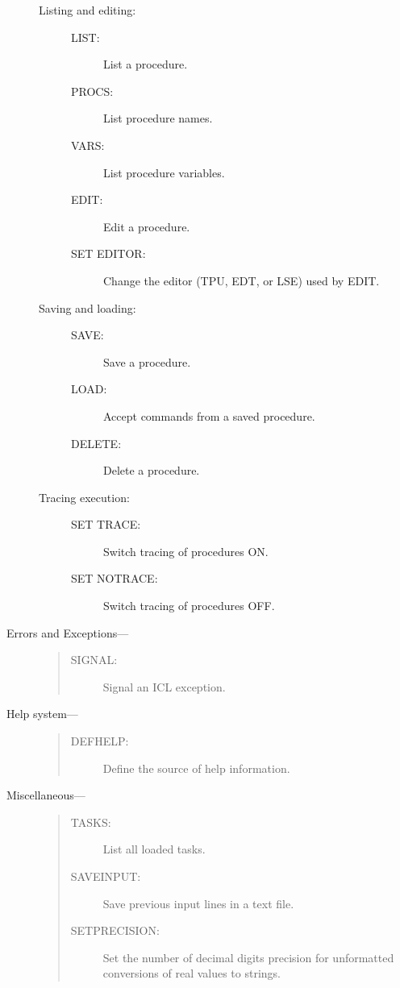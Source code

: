 \begin{description}
\begin{description}
\item [Listing and editing:] \mbox{}
\begin{description}
\item[LIST:]
 List a procedure.
\item[PROCS:]
 List procedure names.
\item[VARS:]
 List procedure variables.
\item[EDIT:]
 Edit a procedure.
\item[SET EDITOR:]
 Change the editor (TPU, EDT, or LSE) used by EDIT.
\end{description}
\item [Saving and loading:] \mbox{}
\begin{description}
\item[SAVE:]
 Save a procedure.
\item[LOAD:]
 Accept commands from a saved procedure.
\item[DELETE:]
 Delete a procedure.
\end{description}
\item [Tracing execution:] \mbox{}
\begin{description}
\item[SET TRACE:]
 Switch tracing of procedures ON.
\item[SET NOTRACE:]
 Switch tracing of procedures OFF.
\end{description}
\end{description}

\item [Errors and Exceptions--- ]

\begin{quote}
\begin{description}
\item[SIGNAL:]
 Signal an ICL exception.
\end{description}
\end{quote}

\item [Help system--- ]

\begin{quote}
\begin{description}
\item[DEFHELP:]
 Define the source of help information.
\end{description}
\end{quote}

\item [Miscellaneous--- ]

\begin{quote}
\begin{description}
\item[TASKS:]
 List all loaded tasks.
\item[SAVEINPUT:]
 Save previous input lines in a text file.
\item[SETPRECISION:]
 Set the number of decimal digits precision for unformatted conversions
 of real values to strings.
\end{description}
\end{quote}
\end{description}

